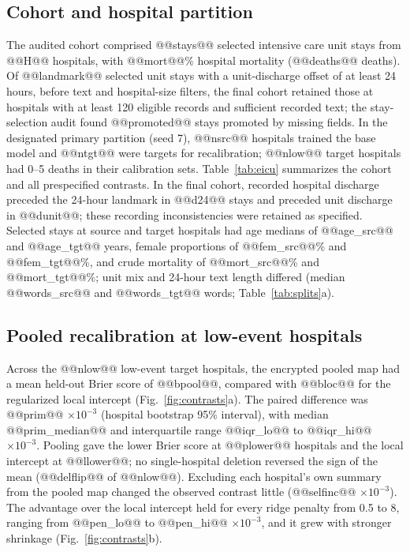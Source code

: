 \documentclass[11pt]{article}
\begin{document}
\subsection*{Cohort and hospital partition}
The audited cohort comprised @@stays@@ selected intensive care unit stays from @@H@@ hospitals, with @@mort@@\% hospital mortality (@@deaths@@ deaths). Of @@landmark@@ selected unit stays with a unit-discharge offset of at least 24 hours, before text and hospital-size filters, the final cohort retained those at hospitals with at least 120 eligible records and sufficient recorded text; the stay-selection audit found @@promoted@@ stays promoted by missing fields. In the designated primary partition (seed 7), @@nsrc@@ hospitals trained the base model and @@ntgt@@ were targets for recalibration; @@nlow@@ target hospitals had 0--5 deaths in their calibration sets. Table~\ref{tab:eicu} summarizes the cohort and all prespecified contrasts. In the final cohort, recorded hospital discharge preceded the 24-hour landmark in @@d24@@ stays and preceded unit discharge in @@dunit@@; these recording inconsistencies were retained as specified. Selected stays at source and target hospitals had age medians of @@age_src@@ and @@age_tgt@@ years, female proportions of @@fem_src@@\% and @@fem_tgt@@\%, and crude mortality of @@mort_src@@\% and @@mort_tgt@@\%; unit mix and 24-hour text length differed (median @@words_src@@ and @@words_tgt@@ words; Table~\ref{tab:splits}a).

\subsection*{Pooled recalibration at low-event hospitals}
Across the @@nlow@@ low-event target hospitals, the encrypted pooled map had a mean held-out Brier score of @@bpool@@, compared with @@bloc@@ for the regularized local intercept (Fig.~\ref{fig:contrasts}a). The paired difference was @@prim@@ $\times10^{-3}$ (hospital bootstrap 95\% interval), with median @@prim_median@@ and interquartile range @@iqr_lo@@ to @@iqr_hi@@ $\times10^{-3}$. Pooling gave the lower Brier score at @@plower@@ hospitals and the local intercept at @@llower@@; no single-hospital deletion reversed the sign of the mean (@@delflip@@ of @@nlow@@). Excluding each hospital's own summary from the pooled map changed the observed contrast little (@@selfinc@@ $\times10^{-3}$). The advantage over the local intercept held for every ridge penalty from 0.5 to 8, ranging from @@pen_lo@@ to @@pen_hi@@ $\times10^{-3}$, and it grew with stronger shrinkage (Fig.~\ref{fig:contrasts}b).
\end{document}
